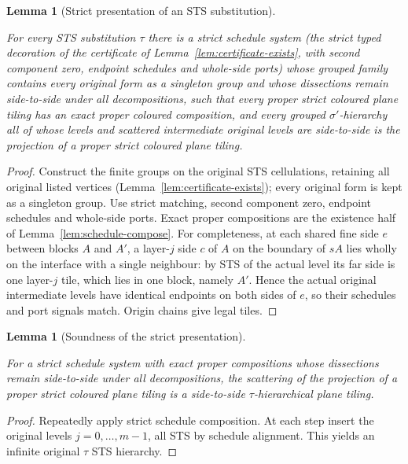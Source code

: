 \documentclass[11pt,a4paper]{article}
\newtheorem{lemma}[definition]{Lemma}
\theoremstyle{remark}
\newcommand{\lean}[1]{}
\newcommand{\uses}[1]{}
\begin{document}
\begin{lemma}[Strict presentation of an STS substitution]\label{lem:strict-presentation}
\lean{Tilings.Alignment.exists_strict_schedule_system,Tilings.Alignment.StrictScheduleSystem.HasCompositions,Tilings.Alignment.StrictScheduleSystem.Complete,Tilings.Planned.Strict.strictSystem,Tilings.Planned.Strict.strictSystem_hasCompositions,Tilings.Planned.Strict.strictSystem_complete,Tilings.Planned.Strict.strict_actual_schedules_aligned,Tilings.Planned.Strict.strict_lift_decorations,Tilings.Planned.Strict.strict_lift_matched,Tilings.Planned.Strict.exists_strict_schedule_system_of_certificate}
\uses{def:sts,lem:certificate-exists,lem:schedule-compose,lem:whole-ports,def:endpoint-schedule}
For every STS substitution $\tau$ there is a strict schedule system (the
strict typed decoration of the certificate of
Lemma~\ref{lem:certificate-exists}, with second component zero, endpoint
schedules and whole-side ports) whose grouped family contains every original
form as a singleton group and whose dissections remain side-to-side under
all decompositions, such that every proper strict coloured plane tiling has
an exact proper coloured composition, and every grouped $\sigma'$-hierarchy
all of whose levels and scattered intermediate original levels are
side-to-side is the projection of a proper strict coloured plane tiling.
\end{lemma}
\begin{proof}
Construct the finite groups on the original STS cellulations, retaining all
original listed vertices (Lemma~\ref{lem:certificate-exists}); every original
form is kept as a singleton group. Use strict matching, second component
zero, endpoint schedules and whole-side ports. Exact proper compositions are
the existence half of Lemma~\ref{lem:schedule-compose}. For completeness, at
each shared fine side $e$ between blocks $A$ and $A'$, a layer-$j$ side $c$
of $A$ on the boundary of $sA$ lies wholly on the interface with a single
neighbour: by STS of the actual level its far side is one layer-$j$ tile,
which lies in one block, namely $A'$. Hence the actual original intermediate
levels have identical endpoints on both sides of $e$, so their schedules and
port signals match. Origin chains give legal tiles.
\end{proof}

\begin{lemma}[Soundness of the strict presentation]\label{lem:strict-sound}
\lean{Tilings.Alignment.sts_hierarchical_of_strict_proper}
\uses{lem:strict-presentation,lem:strict-projection,lem:schedule-compose,lem:alignment-tuple,def:hierarchy}
For a strict schedule system with exact proper compositions whose
dissections remain side-to-side under all decompositions, the scattering of
the projection of a proper strict coloured plane tiling is a side-to-side
$\tau$-hierarchical plane tiling.
\end{lemma}
\begin{proof}
Repeatedly apply strict schedule composition. At each step insert the
original levels $j=0,\ldots,m-1$, all STS by schedule alignment. This yields
an infinite original $\tau$ STS hierarchy.
\end{proof}
\end{document}
